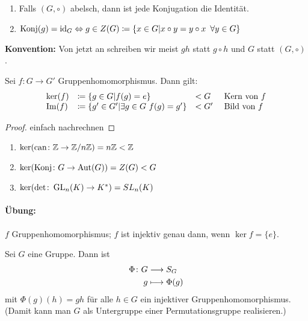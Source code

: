 \documentclass[12pt,a4paper]{scrartcl}
\begin{document}
\begin{bem}
	\leavevmode
	\begin{enumerate}
		\item 	Falls $(G,\circ)$ abelsch, dann ist jede Konjugation die Identität.
		\item $\operatorname{Konj}(g) = \text{id}_G \Leftrightarrow g\in Z(G)\coloneqq\{x\in G|x\circ y = y\circ x\enspace \forall y\in G\}$
	\end{enumerate}
\end{bem}

\noindent\textbf{Konvention:} Von jetzt an schreiben wir meist $gh$ statt $g\circ h$ und $G$ statt $(G,\circ)$.

\begin{satz} \label{thm:kerim_g}
	Sei $f\colon G\to G'$ Gruppenhomomorphismus. Dann gilt:	
	\begin{equation*}
	\begin{array}{llll}
		\operatorname{ker}(f) & \coloneqq \{g\in G|f(g) = e\}                  & <G & \mbox{ Kern von }f\\
		\operatorname{Im}(f)  & \coloneqq \{g'\in G'|\exists g\in G\ f(g)=g'\} & <G'& \text{ Bild von }f
	\end{array}
	\end{equation*}
\end{satz}

\begin{proof}
	einfach nachrechnen
\end{proof}
\begin{bsp}
	\leavevmode
	\begin{enumerate}
		\item $\operatorname{ker}(\text{can}\colon \mathbb Z\to \mathbb Z/n\mathbb Z) = n\mathbb Z<\mathbb Z$
		\item $\operatorname{ker}(\operatorname{Konj}\colon G\to \operatorname{Aut}(G)) = Z(G)<G$
		\item $\operatorname{ker}(\det\colon \operatorname{GL}_n(K)\to K^*) = SL_n(K)$
	\end{enumerate}
\end{bsp}

\paragraph{Übung:} $f$ Gruppenhomomorphismus; $f$ ist injektiv genau dann, wenn $\ker f = \{e\}$.

\begin{satz} \label{thm:cayley}
	Sei $G$ eine Gruppe. Dann ist
	\begin{align*}
		\Phi \colon G&\longrightarrow S_G\\
		g&\longmapsto \Phi(g)
	\end{align*} mit $\Phi(g)(h) = gh$ für alle $h\in G$ ein injektiver Gruppenhomomorphismus. \textup(Damit kann man $G$ als Untergruppe einer Permutationsgruppe \glqq realisieren\grqq.\textup)
\end{satz}
\end{document}
